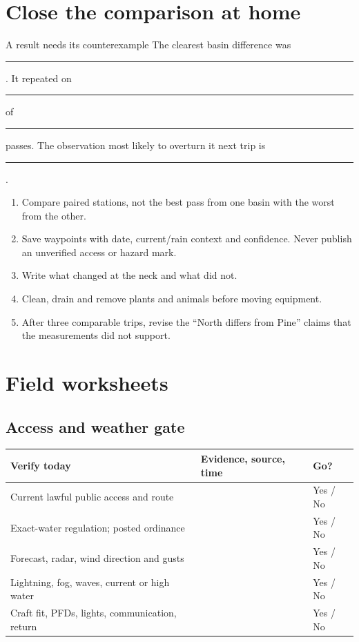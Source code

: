 \section{Close the comparison at home}
\begin{teloscard}{A result needs its counterexample}
The clearest basin difference was \rule{2.6in}{.4pt}. It repeated on
\rule{.55in}{.4pt} of \rule{.55in}{.4pt} passes. The observation most likely
to overturn it next trip is \rule{2.5in}{.4pt}.
\end{teloscard}
\begin{enumerate}
\item Compare paired stations, not the best pass from one basin with the worst
from the other.
\item Save waypoints with date, current/rain context and confidence. Never
publish an unverified access or hazard mark.
\item Write what changed at the neck and what did not.
\item Clean, drain and remove plants and animals before moving equipment.
\item After three comparable trips, revise the ``North differs from Pine''
claims that the measurements did not support.
\end{enumerate}

\section{Field worksheets}

\subsection{Access and weather gate}
\begin{tabularx}{\linewidth}{@{}p{.30\linewidth}X p{.14\linewidth}@{}}
\toprule
\textbf{Verify today} & \textbf{Evidence, source, time} & \textbf{Go?}\\
\midrule
Current lawful public access and route && Yes / No\\
Exact-water regulation; posted ordinance && Yes / No\\
Forecast, radar, wind direction and gusts && Yes / No\\
Lightning, fog, waves, current or high water && Yes / No\\
Craft fit, PFDs, lights, communication, return && Yes / No\\
\bottomrule
\end{tabularx}

